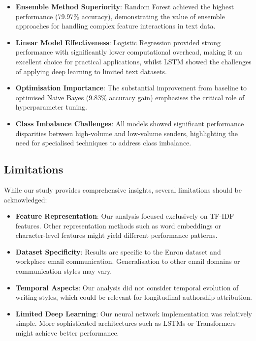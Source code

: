 \documentclass[11pt,a4paper]{article}
\begin{document}
\begin{itemize}
    \item \textbf{Ensemble Method Superiority}: Random Forest achieved the highest performance (79.97\% accuracy), demonstrating the value of ensemble approaches for handling complex feature interactions in text data.
    
    \item \textbf{Linear Model Effectiveness}: Logistic Regression provided strong performance with significantly lower computational overhead, making it an excellent choice for practical applications, whilst LSTM showed the challenges of applying deep learning to limited text datasets.
    
    \item \textbf{Optimisation Importance}: The substantial improvement from baseline to optimised Naive Bayes (9.83\% accuracy gain) emphasises the critical role of hyperparameter tuning.
    
    \item \textbf{Class Imbalance Challenges}: All models showed significant performance disparities between high-volume and low-volume senders, highlighting the need for specialised techniques to address class imbalance.
\end{itemize}

\subsection{Limitations}

While our study provides comprehensive insights, several limitations should be acknowledged:

\begin{itemize}
    \item \textbf{Feature Representation}: Our analysis focused exclusively on TF-IDF features. Other representation methods such as word embeddings or character-level features might yield different performance patterns.
    
    \item \textbf{Dataset Specificity}: Results are specific to the Enron dataset and workplace email communication. Generalisation to other email domains or communication styles may vary.
    
    \item \textbf{Temporal Aspects}: Our analysis did not consider temporal evolution of writing styles, which could be relevant for longitudinal authorship attribution.
    
    \item \textbf{Limited Deep Learning}: Our neural network implementation was relatively simple. More sophisticated architectures such as LSTMs or Transformers might achieve better performance.
\end{itemize}
\end{document}
